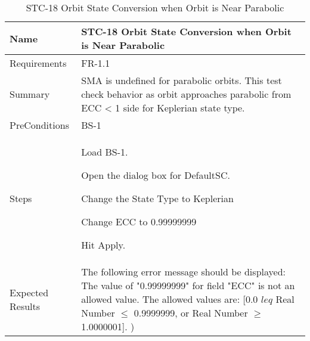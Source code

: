 \begin{table}[htbp!]
\centering
      \begin{tabular}{|p{1.05 in} |p{4.75 in} |}
      \hline
         \rowcolor[rgb]{0.8,0.8,0.8} Name & STC-18 Orbit State Conversion when Orbit is Near Parabolic\\
         \hline
         Requirements & FR-1.1\\  \hline
         Summary &
         SMA is undefined for parabolic orbits.  This test check behavior as orbit approaches parabolic
         from ECC < 1 side for Keplerian state type.
         \\     \hline
         PreConditions & BS-1\\     \hline
         Steps &
         \begin{compactenum}
             \item Load BS-1.
             \item Open the dialog box for DefaultSC.
             \item Change the State Type to Keplerian
             \item Change ECC to 0.99999999
             \item Hit Apply.
         \end{compactenum}
         \\ \hline
         Expected Results & The following error message should be displayed:
         The value of "0.99999999" for field "ECC" is not an allowed value.
         The allowed values are: [0.0 $leq$ Real Number $\leq$ 0.9999999, or Real Number $\geq$ 1.0000001].
         )\\
      \hline
      \end{tabular}
      \label{Table:STC-18}
      \caption{STC-18 Orbit State Conversion when Orbit is Near Parabolic}
\end{table} 